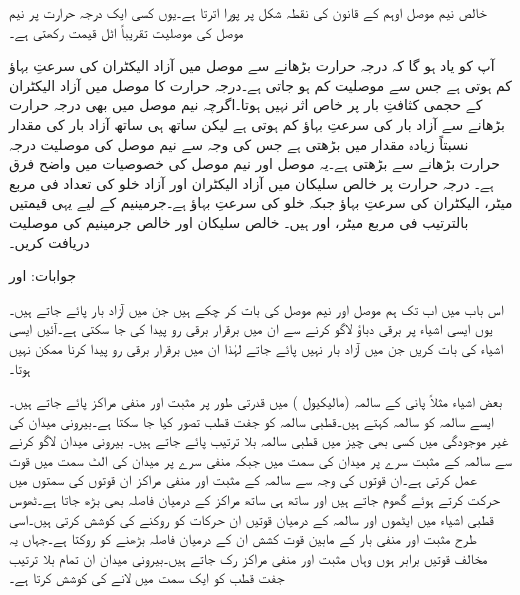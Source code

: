 خالص نیم موصل اوہم کے قانون کی نقطہ شکل پر پورا اترتا ہے۔یوں کسی ایک درجہ حرارت پر نیم موصل کی موصلیت تقریباً اٹل قیمت رکھتی ہے۔  

آپ کو یاد ہو گا کہ درجہ حرارت بڑھانے سے موصل میں آزاد الیکٹران کی سرعتِ بہاؤ کم ہوتی   ہے جس سے موصلیت کم  ہو جاتی ہے۔درجہ حرارت کا موصل میں آزاد الیکٹران کے حجمی کثافتِ بار پر خاص اثر نہیں ہوتا۔اگرچہ نیم موصل میں بھی درجہ حرارت بڑھانے سے آزاد بار کی  سرعتِ بہاؤ کم ہوتی ہے لیکن ساتھ ہی ساتھ آزاد بار کی مقدار نسبتاً زیادہ مقدار میں بڑھتی ہے جس  کی وجہ سے نیم موصل کی  موصلیت درجہ حرارت بڑھانے سے بڑھتی ہے۔یہ موصل اور نیم موصل کی خصوصیات میں واضح فرق ہے۔
 درجہ حرارت پر خالص سلیکان میں آزاد الیکٹران اور آزاد خلو کی تعداد  فی مربع میٹر، الیکٹران کی  سرعتِ بہاؤ  جبکہ خلو کی سرعتِ بہاؤ  ہے۔جرمینیم کے لیے یہی قیمتیں بالترتیب  فی مربع میٹر،  اور  ہیں۔ خالص سلیکان اور خالص جرمینیم کی موصلیت دریافت کریں۔

جوابات: اور 


اس باب میں اب تک ہم موصل اور نیم موصل کی بات کر چکے ہیں جن میں آزاد بار پائے جاتے ہیں۔یوں ایسی اشیاء پر برقی دباؤ لاگو کرنے سے ان میں برقرار برقی رو پیدا کی جا سکتی ہے۔آئیں ایسی اشیاء کی بات کریں جن میں آزاد بار نہیں پائے جاتے لہٰذا ان میں برقرار برقی رو پیدا کرنا ممکن نہیں ہوتا۔

بعض اشیاء مثلاً پانی  کے سالمہ (مالیکیول ) میں قدرتی طور پر مثبت اور منفی مراکز پائے جاتے  ہیں۔ایسے سالمہ کو  سالمہ کہتے ہیں۔قطبی سالمہ کو جفت قطب تصور کیا جا سکتا ہے۔بیرونی میدان کی غیر موجودگی میں کسی بھی چیز میں قطبی سالمہ بلا ترتیب پائے جاتے ہیں۔ بیرونی میدان  لاگو کرنے سے سالمہ کے مثبت سرے پر میدان کی سمت میں جبکہ منفی سرے پر میدان کی الٹ سمت میں  قوت عمل کرتی ہے۔ان قوتوں کی وجہ سے سالمہ کے مثبت اور منفی مراکز ان قوتوں کی سمتوں میں حرکت کرتے ہوئے گھوم جاتے ہیں اور ساتھ ہی ساتھ مراکز کے درمیان فاصلہ بھی بڑھ جاتا ہے۔ٹھوس قطبی اشیاء میں ایٹموں اور سالمہ کے درمیان قوتیں ان حرکات کو روکنے کی کوشش کرتی ہیں۔اسی طرح مثبت اور منفی بار کے مابین قوت کشش ان کے درمیان فاصلہ بڑھنے کو روکتا ہے۔جہاں یہ مخالف قوتیں برابر ہوں وہاں مثبت اور منفی مراکز رک جاتے ہیں۔بیرونی میدان ان تمام بلا ترتیب جفت قطب کو ایک سمت میں لانے کی کوشش کرتا ہے۔

